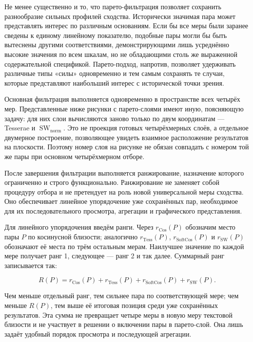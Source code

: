 Не менее существенно и то, что парето-фильтрация позволяет сохранить разнообразие сильных профилей сходства. Исторически значимая пара может представлять интерес по различным основаниям. Если бы все меры были заранее сведены к единому линейному показателю, подобные пары могли бы быть вытеснены другими соответствиями, демонстрирующими лишь усреднённо высокие значения по всем шкалам, но не обладающими столь же выраженной содержательной спецификой. Парето-подход, напротив, позволяет удерживать различные типы «силы» одновременно и тем самым сохранять те случаи, которые представляют наибольший интерес с исторической точки зрения.

Основная фильтрация выполняется одновременно в пространстве всех четырёх мер. Представленные ниже рисунки с парето-слоями имеют иную, поясняющую задачу: для них слои вычисляются заново только по двум координатам --- Tesserae и $\operatorname{SW}_{\mathrm{norm}}$. Это не проекция готовых четырёхмерных слоёв, а отдельное двумерное построение, позволяющее увидеть взаимное расположение результатов на плоскости. Поэтому номер слоя на рисунке не обязан совпадать с номером той же пары при основном четырёхмерном отборе.

После завершения фильтрации выполняется ранжирование, назначение которого ограниченно и строго функционально. Ранжирование не заменяет собой процедуру отбора и не претендует на роль новой универсальной меры сходства. Оно обеспечивает линейное упорядочение уже сохранённых пар, необходимое для их последовательного просмотра, агрегации и графического представления.

Для линейного упорядочения введём ранги. Через $r_{\mathrm{Cos}}(P)$ обозначим место пары $P$ по косинусной близости; аналогично $r_{\mathrm{Tess}}(P)$, $r_{\mathrm{SoftCos}}(P)$ и $r_{\mathrm{SW}}(P)$ обозначают её места по трём остальным мерам. Наилучшее значение по каждой мере получает ранг 1, следующее --- ранг 2 и так далее. Суммарный ранг записывается так:

\begin{equation}
R(P)=r_{\mathrm{Cos}}(P)+r_{\mathrm{Tess}}(P)
+r_{\mathrm{SoftCos}}(P)+r_{\mathrm{SW}}(P).
\end{equation}

Чем меньше отдельный ранг, тем сильнее пара по соответствующей мере; чем меньше $R(P)$, тем выше её итоговая позиция среди уже сохранённых результатов. Эта сумма не превращает четыре меры в новую меру текстовой близости и не участвует в решении о включении пары в парето-слой. Она лишь задаёт удобный порядок просмотра и последующей агрегации.

